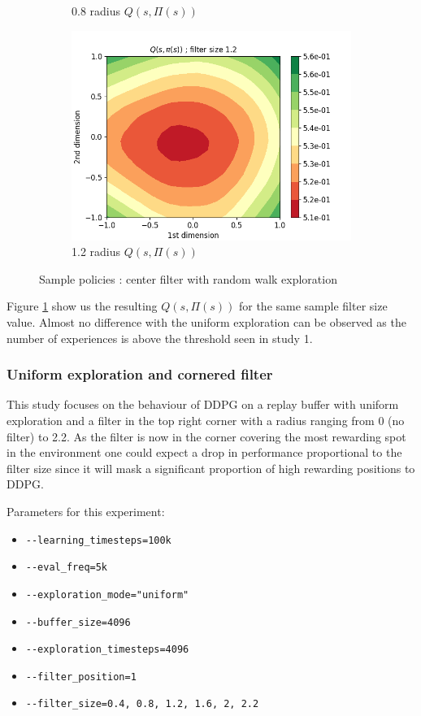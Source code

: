 \documentclass{article}
\begin{document}
\begin{figure}[H]
\begin{subfigure}[b]{0.3\linewidth}
      \caption{0.8 radius $Q(s, \Pi(s))$}
  \end{subfigure}
   \begin{subfigure}[b]{0.3\linewidth}
    \includegraphics[width=\linewidth]{Study_2/2.2/visualizations/Q_contour_1_2.png}
      \caption{1.2 radius $Q(s, \Pi(s))$}
  \end{subfigure}
   \caption{Sample policies : center filter with random walk exploration}
    \label{fig:center_contour_random_walk}
\end{figure}

Figure \ref{fig:center_contour_random_walk} show us the resulting $Q(s, \Pi(s))$ for the same sample filter size value. Almost no difference with the uniform exploration can be observed as the number of experiences is above the threshold seen in study 1.

\subsubsection{Uniform exploration and cornered filter}

This study focuses on the behaviour of DDPG on a replay buffer with uniform exploration and a filter in the top right corner with a radius ranging from 0 (no filter) to 2.2. As the filter is now in the corner covering the most rewarding spot in the environment one could expect a drop in performance proportional to the filter size since it will mask a significant proportion of high rewarding positions to DDPG.

Parameters for this experiment:
\begin{itemize}
    \item[] \lstinline|--learning_timesteps=100k|
    \item[] \lstinline|--eval_freq=5k|
    \item[] \lstinline|--exploration_mode="uniform"|
    \item[] \lstinline|--buffer_size=4096|
    \item[] \lstinline|--exploration_timesteps=4096|
    \item[] \lstinline|--filter_position=1|
    \item[] \lstinline|--filter_size=0.4, 0.8, 1.2, 1.6, 2, 2.2|
\end{itemize}
\end{document}

